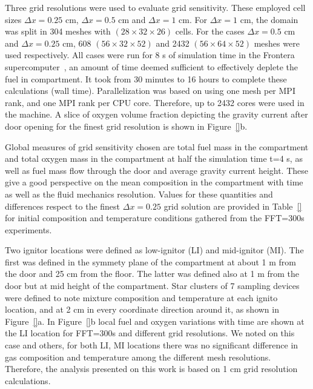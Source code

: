 \documentclass[12pt,letterpaper]{article}
\begin{document}
\begin{flushleft}
Three grid resolutions were used to evaluate grid sensitivity. These employed cell sizes $\Delta x=0.25$ cm, $\Delta x=0.5$ cm and $\Delta x=1$ cm. For $\Delta x=1$ cm, the domain was split in 304 meshes with $(28\times32\times26)$ cells. For the cases $\Delta x=0.5$ cm and $\Delta x=0.25$ cm, 608 $(56\times32\times52)$ and 2432 $(56\times64\times52)$ meshes were used respectively. All cases were run for 8 s of simulation time in the Frontera supercomputer~\cite{}, an amount of time deemed sufficient to effectively deplete the fuel in compartment. It took from 30 minutes to 16 hours to complete these calculations (wall time). Parallelization was based on using one mesh per MPI rank, and one MPI rank per CPU core. Therefore, up to 2432 cores were used in the machine. A slice of oxygen volume fraction depicting the gravity current after door opening for the finest grid resolution is shown in Figure~\ref{}b.   



Global measures of grid sensitivity chosen are total fuel mass in the compartment and total oxygen mass in the compartment at half the simulation time t=4 s, as well as fuel mass flow through the door and average gravity current height. These give a good perspective on the mean composition in the compartment with time as well as the fluid mechanics resolution. Values for these quantities and differences respect to the finest  $\Delta x=0.25$ grid solution are provided in Table~\ref{} for initial composition and temperature conditions gathered from the FFT=300s experiments.





Two ignitor locations were defined as low-ignitor (LI) and mid-ignitor (MI). The first was defined in the symmety plane of the compartment at about 1 m from the door and 25 cm from the floor. The latter was defined also at 1 m from the door but at mid height of the compartment. Star clusters of 7 sampling devices were defined to note mixture composition and temperature at each ignito location, and at 2 cm in every coordinate direction around it, as shown in Figure~\ref{}a.
In Figure~\ref{}b local fuel and oxygen variations with time are shown at the LI location for FFT=300s and different grid resolutions. We noted on this case and others, for both LI, MI locations there was no significant difference in gas composition and temperature among the different mesh resolutions. Therefore, the analysis presented on this work is based on 1 cm grid resolution calculations.


\end{flushleft}
\end{document}
